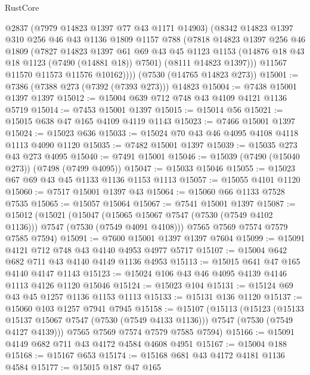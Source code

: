 \begin{lexlean}{RustCore}
\begin{coremodule}
          @2837
          (@7979 @14823 @1397 @77 @43 @1171 @14903)
          (@8342
            @14823
            @1397
            @310
            @256
            @46
            @43
            @1136
            @1809
            @1157
            @788
            (@7818
              @14823
              @1397
              @256
              @46
              @1809
              (@7827
                @14823
                @1397
                @61
                @69
                @43
                @45
                @1123
                @1153
                (@14876 @18 @43 @18 @1123 (@7490 (@14881 @18)) @7501)
                (@8111 @14823 @1397)))
            @11567
            @11570
            @11573
            @11576
            @10162))))
    (@7530 (@14765 @14823 @273))
@15001 := @7386 (@7388 @273 (@7392 (@7393 @273))) @14823
@15004 := @7438 @15001 @1397 @1397
@15012 := @15004 @639 @712 @748 @43 @4109 @4121 @1136 @5719
@15014 := @7453 @15001 @1397
@15015 := @15014 @56
@15021 := @15015 @638 @47 @165 @4109 @4119 @1143
@15023 := @7466 @15001 @1397
@15024 := @15023 @636
@15033 := @15024 @70 @43 @46 @4095 @4108 @4118 @1113 @4090 @1120
@15035 := @7482 @15001 @1397
@15039 := @15035 @273 @43 @273 @4095
@15040 := @7491 @15001
@15046 := @15039 (@7490 (@15040 @273)) (@7498 (@7499 @4095))
@15047 := @15033 @15046
@15055 := @15023 @67 @69 @43 @45 @1133 @1136 @1153 @1113
@15057 := @15055 @4101 @1120
@15060 := @7517 @15001 @1397 @43
@15064 := @15060 @66 @1133 @7528 @7535
@15065 := @15057 @15064
@15067 := @7541 @15001 @1397
@15087 := @15012
    (@15021
      (@15047 (@15065 @15067 @7547 (@7530 (@7549 @4102 @1136))) @7547 (@7530 (@7549 @4091 @4108)))
      @7565
      @7569
      @7574
      @7579
      @7585
      @7594)
@15091 := @7600 @15001 @1397 @1397 @7604
@15099 := @15091 @4121 @712 @748 @43 @4140 @4953 @4977 @5717
@15107 := @15004 @642 @682 @711 @43 @4140 @4149 @1136 @4953
@15113 := @15015 @641 @47 @165 @4140 @4147 @1143
@15123 := @15024 @106 @43 @46 @4095 @4139 @4146 @1113 @4126 @1120 @15046
@15124 := @15023 @104
@15131 := @15124 @69 @43 @45 @1257 @1136 @1153 @1113
@15133 := @15131 @136 @1120
@15137 := @15060 @103 @1257 @7941 @7945
@15158 := @15107
    (@15113
      (@15123
        (@15133 @15137 @15067 @7547 (@7530 (@7549 @4133 @1136)))
        @7547
        (@7530 (@7549 @4127 @4139)))
      @7565
      @7569
      @7574
      @7579
      @7585
      @7594)
@15166 := @15091 @4149 @682 @711 @43 @4172 @4584 @4608 @4951
@15167 := @15004 @188
@15168 := @15167 @653
@15174 := @15168 @681 @43 @4172 @4181 @1136 @4584
@15177 := @15015 @187 @47 @165

\end{coremodule}
\end{lexlean}
